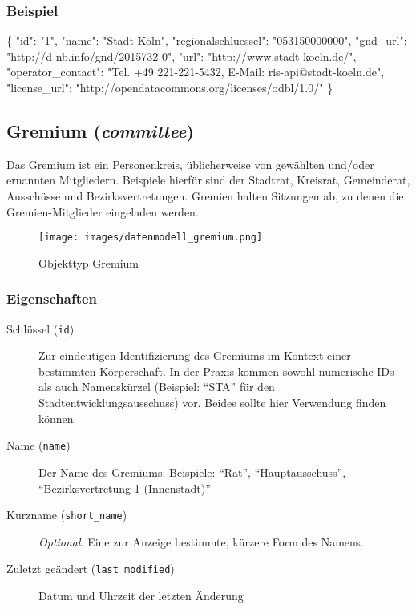 \documentclass[,a4paper]{article}
\makeatletter
\newenvironment{Shaded}{}{}
\newcommand{\DataTypeTok}[1]{\textcolor[rgb]{0.56,0.13,0.00}{{#1}}}
\newcommand{\StringTok}[1]{\textcolor[rgb]{0.25,0.44,0.63}{{#1}}}
\newcommand{\NormalTok}[1]{{#1}}
\def\maxwidth{\ifdim\Gin@nat@width>\linewidth\linewidth
\else\Gin@nat@width\fi}
\let\Oldincludegraphics\includegraphics
\renewcommand{\includegraphics}[1]{\Oldincludegraphics[width=\maxwidth]{#1}}
\makeatother
\begin{document}
\subsubsection{Beispiel}

\begin{Shaded}
\begin{Highlighting}[]
\NormalTok{\{}
    \DataTypeTok{"id"}\NormalTok{: }\StringTok{"1"}\NormalTok{,}
    \DataTypeTok{"name"}\NormalTok{: }\StringTok{"Stadt Köln"}\NormalTok{,}
    \DataTypeTok{"regionalschluessel"}\NormalTok{: }\StringTok{"053150000000"}\NormalTok{,}
    \DataTypeTok{"gnd_url"}\NormalTok{: }\StringTok{"http://d-nb.info/gnd/2015732-0"}\NormalTok{,}
    \DataTypeTok{"url"}\NormalTok{: }\StringTok{"http://www.stadt-koeln.de/"}\NormalTok{,}
    \DataTypeTok{"operator_contact"}\NormalTok{: }\StringTok{"Tel. +49 221-221-5432, E-Mail: ris-api@stadt-koeln.de"}\NormalTok{,}
    \DataTypeTok{"license_url"}\NormalTok{: }\StringTok{"http://opendatacommons.org/licenses/odbl/1.0/"}
\NormalTok{\}}
\end{Highlighting}
\end{Shaded}

\subsection{Gremium (\emph{committee})}

Das Gremium ist ein Personenkreis, üblicherweise von gewählten und/oder
ernannten Mitgliedern. Beispiele hierfür sind der Stadtrat, Kreisrat,
Gemeinderat, Ausschüsse und Bezirksvertretungen. Gremien halten
Sitzungen ab, zu denen die Gremien-Mitglieder eingeladen werden.

\begin{figure}[htbp]
\centering
\texttt{[image: images/datenmodell\_gremium.png]}
\caption{Objekttyp Gremium}
\end{figure}

\subsubsection{Eigenschaften}

\begin{description}
\item[Schlüssel (\texttt{id})]
Zur eindeutigen Identifizierung des Gremiums im Kontext einer bestimmten
Körperschaft. In der Praxis kommen sowohl numerische IDs als auch
Namenskürzel (Beispiel: ``STA'' für den Stadtentwicklungsausschuss) vor.
Beides sollte hier Verwendung finden können.
\item[Name (\texttt{name})]
Der Name des Gremiums. Beispiele: ``Rat'', ``Hauptausschuss'',
``Bezirksvertretung 1 (Innenstadt)''
\item[Kurzname (\texttt{short\_name})]
\emph{Optional}. Eine zur Anzeige bestimmte, kürzere Form des Namens.
\item[Zuletzt geändert (\texttt{last\_modified})]
Datum und Uhrzeit der letzten Änderung
\end{description}
\end{document}
